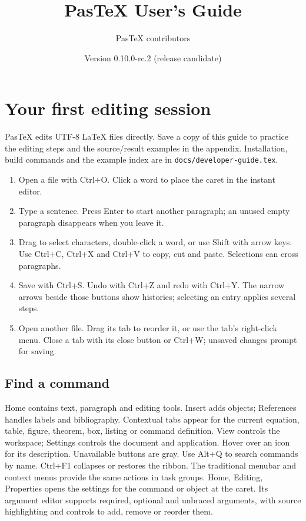 \documentclass[11pt]{article}
\title{PasTeX User's Guide}
\author{PasTeX contributors}
\date{Version 0.10.0-rc.2 (release candidate)}
\begin{document}
\maketitle
\tableofcontents

\section{Your first editing session}
PasTeX edits UTF-8 \LaTeX{} files directly. Save a copy of this guide to
practice the editing steps and the source/result examples in the appendix.
Installation, build commands and the example index are in \texttt{docs/developer-guide.tex}.

\begin{enumerate}
\item Open a file with Ctrl+O. Click a word to place the caret in the instant editor.
\item Type a sentence. Press Enter to start another paragraph; an unused empty
paragraph disappears when you leave it.
\item Drag to select characters, double-click a word, or use Shift with arrow keys.
Use Ctrl+C, Ctrl+X and Ctrl+V to copy, cut and paste. Selections can cross paragraphs.
\item Save with Ctrl+S. Undo with Ctrl+Z and redo with Ctrl+Y. The narrow arrows
beside those buttons show histories; selecting an entry applies several steps.
\item Open another file. Drag its tab to reorder it, or use the tab's right-click
menu. Close a tab with its close button or Ctrl+W; unsaved changes prompt for saving.
\end{enumerate}

\subsection{Find a command}
Home contains text, paragraph and editing tools. Insert adds objects; References
handles labels and bibliography. Contextual tabs appear for the current equation,
table, figure, theorem, box, listing or command definition. View controls the
workspace; Settings controls the document and application.
Hover over an icon for its description. Unavailable buttons are gray.
Use Alt+Q to search commands by name. Ctrl+F1 collapses or restores the ribbon.
The traditional menubar and context menus provide the same actions in task groups.
Home, Editing, Properties opens the settings for the command or object at the
caret. Its argument editor supports required, optional and unbraced arguments,
with source highlighting and controls to add, remove or reorder them.
\end{document}
